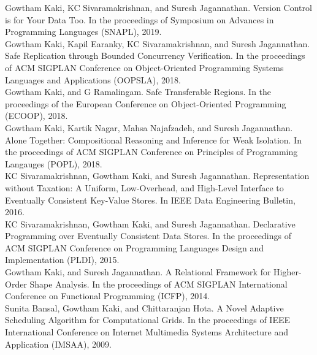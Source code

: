 \documentclass[margin,line]{res}
\begin{document}
\begin{resume}
Gowtham Kaki, KC Sivaramakrishnan, and Suresh Jagannathan. Version
  Control is for Your Data Too. In the proceedings of Symposium on
  Advances in Programming Languages (SNAPL), 2019.
\vspace*{0.1in}\\
Gowtham Kaki, Kapil Earanky, KC Sivaramakrishnan, and Suresh
  Jagannathan. Safe Replication through Bounded Concurrency
  Verification. In the proceedings of ACM SIGPLAN Conference on
  Object-Oriented Programming Systems Languages and Applications
  (OOPSLA), 2018.
\vspace*{0.1in}\\
Gowtham Kaki, and G Ramalingam. Safe Transferable Regions.  In the
  proceedings of the European Conference on Object-Oriented
  Programming (ECOOP), 2018.
\vspace*{0.1in}\\
Gowtham Kaki, Kartik Nagar, Mahsa Najafzadeh, and Suresh Jagannathan.
  Alone Together: Compositional Reasoning and Inference for Weak
  Isolation. In the proceedings of ACM SIGPLAN Conference on
  Principles of Programming Langauges (POPL), 2018.
\vspace*{0.1in}\\
KC Sivaramakrishnan, Gowtham Kaki, and Suresh Jagannathan.
  Representation without Taxation: A Uniform, Low-Overhead, and
  High-Level Interface to Eventually Consistent Key-Value Stores. In
  IEEE Data Engineering Bulletin, 2016.
\vspace*{0.1in}\\
KC Sivaramakrishnan, Gowtham Kaki, and Suresh Jagannathan.
  Declarative Programming over Eventually Consistent Data Stores. In
  the proceedings of ACM SIGPLAN Conference on Programming Languages
  Design and Implementation (PLDI), 2015.
\vspace*{0.1in}\\
Gowtham Kaki, and Suresh Jagannathan. A Relational Framework for
  Higher-Order Shape Analysis. In the proceedings of ACM SIGPLAN
  International Conference on Functional Programming (ICFP), 2014.
\vspace*{0.1in}\\
Sunita Bansal, Gowtham Kaki, and Chittaranjan Hota. A Novel Adaptive
  Scheduling Algorithm for Computational Grids. In the proceedings of
  IEEE International Conference on Internet Multimedia Systems
  Architecture and Application (IMSAA), 2009.


\end{resume}
\end{document}
